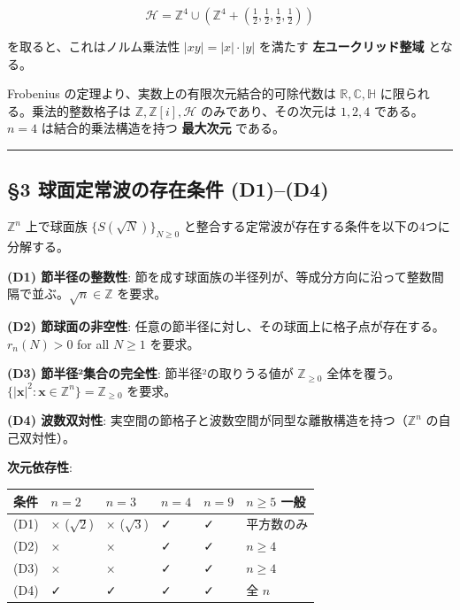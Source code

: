 \documentclass[
  a4paper,11pt]{ltjsarticle}
\newcounter{none}
\theoremstyle{definition}
\theoremstyle{remark}
\begin{document}
\[\mathcal{H} = \mathbb{Z}^4 \cup \left(\mathbb{Z}^4 + \left(\tfrac{1}{2}, \tfrac{1}{2}, \tfrac{1}{2}, \tfrac{1}{2}\right)\right)\]

を取ると、これはノルム乗法性 \(|xy| = |x| \cdot |y|\) を満たす
\textbf{左ユークリッド整域} となる。

Frobenius の定理より、実数上の有限次元結合的可除代数は
\(\mathbb{R}, \mathbb{C}, \mathbb{H}\) に限られる。乗法的整数格子は
\(\mathbb{Z}, \mathbb{Z}[i], \mathcal{H}\) のみであり、その次元は
\(1, 2, 4\) である。\(n = 4\) は結合的乗法構造を持つ \textbf{最大次元}
である。

\begin{center}\rule{0.5\linewidth}{0.5pt}\end{center}

\subsection{§3 球面定常波の存在条件
(D1)--(D4)}\label{ux7403ux9762ux5b9aux5e38ux6ce2ux306eux5b58ux5728ux6761ux4ef6-d1d4}

\(\mathbb{Z}^n\) 上で球面族 \(\{S(\sqrt{N})\}_{N \geq 0}\)
と整合する定常波が存在する条件を以下の4つに分解する。

\textbf{(D1) 節半径の整数性}:
節を成す球面族の半径列が、等成分方向に沿って整数間隔で並ぶ。\(\sqrt{n} \in \mathbb{Z}\)
を要求。

\textbf{(D2) 節球面の非空性}:
任意の節半径に対し、その球面上に格子点が存在する。\(r_n(N) > 0\) for all
\(N \geq 1\) を要求。

\textbf{(D3) 節半径²集合の完全性}: 節半径²の取りうる値が
\(\mathbb{Z}_{\geq 0}\)
全体を覆う。\(\{|\mathbf{x}|^2 : \mathbf{x} \in \mathbb{Z}^n\} = \mathbb{Z}_{\geq 0}\)
を要求。

\textbf{(D4) 波数双対性}:
実空間の節格子と波数空間が同型な離散構造を持つ（\(\mathbb{Z}^n\)
の自己双対性）。

\textbf{次元依存性}:

{\def\LTcaptype{none} %
\begin{longtable}[]{@{}llllll@{}}
\toprule\noalign{}
条件 & \(n=2\) & \(n=3\) & \(n=4\) & \(n=9\) & \(n \geq 5\) 一般 \\
\midrule\noalign{}
\endhead
\bottomrule\noalign{}
\endlastfoot
(D1) & × (\(\sqrt{2}\)) & × (\(\sqrt{3}\)) & ✓ & ✓ & 平方数のみ \\
(D2) & × & × & ✓ & ✓ & \(n \geq 4\) \\
(D3) & × & × & ✓ & ✓ & \(n \geq 4\) \\
(D4) & ✓ & ✓ & ✓ & ✓ & 全 \(n\) \\
\end{longtable}
}
\end{document}
